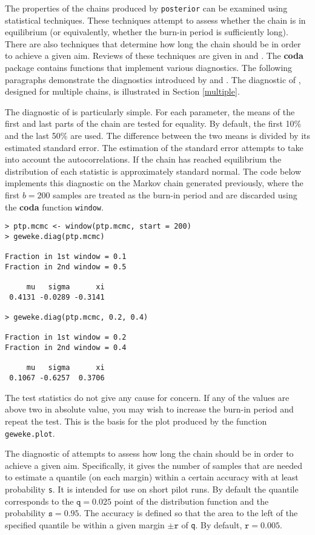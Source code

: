 \documentclass[11pt,a4paper]{article}
\begin{document}
The properties of the chains produced by \verb+posterior+ can be examined using statistical techniques.
These techniques attempt to assess whether the chain is in equilibrium (or equivalently, whether the burn-in period is sufficiently long).
There are also techniques that determine how long the chain should be in order to achieve a given aim.
Reviews of these techniques are given in \citet{cowlcarl96} and \citet{broorobe98}.
The \textbf{coda} package contains functions that implement various diagnostics.
The following paragraphs demonstrate the diagnostics introduced by \citet{gewe92} and \citet{raftlewi92}.
The diagnostic of \citet{gelmrubi92}, designed for multiple chains, is illustrated in Section \ref{multiple}.

The diagnostic of \citet{gewe92} is particularly simple.
For each parameter, the means of the first and last parts of the chain are tested for equality.
By default, the first 10\% and the last 50\% are used.
The difference between the two means is divided by its estimated standard error.
The estimation of the standard error attempts to take into account the autocorrelations.
If the chain has reached equilibrium the distribution of each statistic is approximately standard normal.
The code below implements this diagnostic on the Markov chain generated previously, where the first $b=200$ samples are treated as the burn-in period and are discarded using the \textbf{coda} function \verb+window+. 

\begin{verbatim}
> ptp.mcmc <- window(ptp.mcmc, start = 200)
> geweke.diag(ptp.mcmc)

Fraction in 1st window = 0.1
Fraction in 2nd window = 0.5 

     mu   sigma      xi 
 0.4131 -0.0289 -0.3141 

> geweke.diag(ptp.mcmc, 0.2, 0.4)

Fraction in 1st window = 0.2
Fraction in 2nd window = 0.4 

     mu   sigma      xi 
 0.1067 -0.6257  0.3706 
\end{verbatim}

The test statistics do not give any cause for concern.
If any of the values are above two in absolute value, you may wish to increase the burn-in period and repeat the test.
This is the basis for the plot produced by the function \verb+geweke.plot+.

The diagnostic of \citet{raftlewi92} attempts to assess how long the chain should be in order to achieve a given aim.
Specifically, it gives the number of samples that are needed to estimate a quantile (on each margin) within a certain accuracy with at least probability \verb+s+.
It is intended for use on short pilot runs.
By default the quantile corresponds to the $\texttt{q} = 0.025$ point of the distribution function and the probability $\texttt{s} = 0.95$.
The accuracy is defined so that the area to the left of the specified quantile be within a given margin $\pm \texttt{r}$ of \verb+q+.
By default, $\texttt{r} = 0.005$.
   
\end{document}
